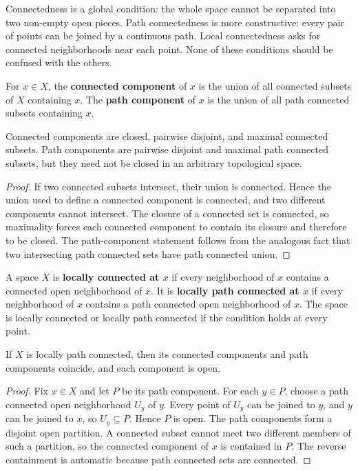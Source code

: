 Connectedness is a global condition: the whole space cannot be separated into two non-empty open pieces. Path connectedness is more constructive: every pair of points can be joined by a continuous path. Local connectedness asks for connected neighborhoods near each point. None of these conditions should be confused with the others.

\begin{definition}
For $x\in X$, the \textbf{connected component} of $x$ is the union of all connected subsets of $X$ containing $x$. The \textbf{path component} of $x$ is the union of all path connected subsets containing $x$.
\end{definition}

\begin{proposition}
Connected components are closed, pairwise disjoint, and maximal connected subsets. Path components are pairwise disjoint and maximal path connected subsets, but they need not be closed in an arbitrary topological space.
\end{proposition}

\begin{proof}
If two connected subsets intersect, their union is connected. Hence the union used to define a connected component is connected, and two different components cannot intersect. The closure of a connected set is connected, so maximality forces each connected component to contain its closure and therefore to be closed. The path-component statement follows from the analogous fact that two intersecting path connected sets have path connected union.
\end{proof}

\begin{definition}
A space $X$ is \textbf{locally connected at $x$} if every neighborhood of $x$ contains a connected open neighborhood of $x$. It is \textbf{locally path connected at $x$} if every neighborhood of $x$ contains a path connected open neighborhood of $x$. The space is locally connected or locally path connected if the condition holds at every point.
\end{definition}

\begin{theorem}
If $X$ is locally path connected, then its connected components and path components coincide, and each component is open.
\end{theorem}

\begin{proof}
Fix $x\in X$ and let $P$ be its path component. For each $y\in P$, choose a path connected open neighborhood $U_y$ of $y$. Every point of $U_y$ can be joined to $y$, and $y$ can be joined to $x$, so $U_y\subseteq P$. Hence $P$ is open. The path components form a disjoint open partition. A connected subset cannot meet two different members of such a partition, so the connected component of $x$ is contained in $P$. The reverse containment is automatic because path connected sets are connected.
\end{proof}

